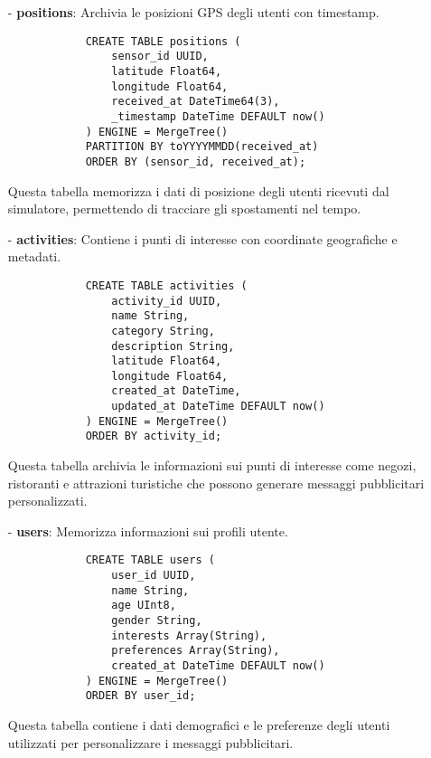\documentclass[10pt]{article}
\begin{document}
        \begin{itemize}
            \item[-] \textbf{positions}: Archivia le posizioni GPS degli utenti con timestamp.
            \begin{lstlisting}
            CREATE TABLE positions (
                sensor_id UUID,
                latitude Float64,
                longitude Float64,
                received_at DateTime64(3),
                _timestamp DateTime DEFAULT now()
            ) ENGINE = MergeTree()
            PARTITION BY toYYYYMMDD(received_at)
            ORDER BY (sensor_id, received_at);
            \end{lstlisting}
            Questa tabella memorizza i dati di posizione degli utenti ricevuti dal simulatore, permettendo di tracciare gli spostamenti nel tempo.
            
            \item[-] \textbf{activities}: Contiene i punti di interesse con coordinate geografiche e metadati.
            \begin{lstlisting}
            CREATE TABLE activities (
                activity_id UUID,
                name String,
                category String,
                description String,
                latitude Float64,
                longitude Float64,
                created_at DateTime,
                updated_at DateTime DEFAULT now()
            ) ENGINE = MergeTree()
            ORDER BY activity_id;
            \end{lstlisting}
            Questa tabella archivia le informazioni sui punti di interesse come negozi, ristoranti e attrazioni turistiche che possono generare messaggi pubblicitari personalizzati.
            
            \item[-] \textbf{users}: Memorizza informazioni sui profili utente.
            \begin{lstlisting}
            CREATE TABLE users (
                user_id UUID,
                name String,
                age UInt8,
                gender String,
                interests Array(String),
                preferences Array(String),
                created_at DateTime DEFAULT now()
            ) ENGINE = MergeTree()
            ORDER BY user_id;
            \end{lstlisting}
            Questa tabella contiene i dati demografici e le preferenze degli utenti utilizzati per personalizzare i messaggi pubblicitari.
            

\end{itemize}
\end{document}
